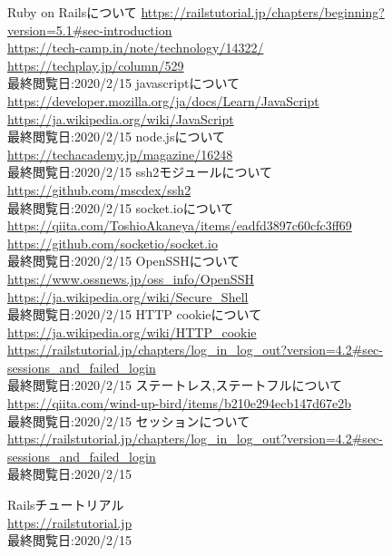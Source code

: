 \begin{thebibliography}{99}
 Ruby on Railsについて \url{https://railstutorial.jp/chapters/beginning?version=5.1#sec-introduction} \\ \url{https://tech-camp.in/note/technology/14322/} \\ \url{https://techplay.jp/column/529}  \\ 最終閲覧日:2020/2/15
 javascriptについて \\ \url{https://developer.mozilla.org/ja/docs/Learn/JavaScript} \\ \url{https://ja.wikipedia.org/wiki/JavaScript}\\ 最終閲覧日:2020/2/15
 node.jsについて \\ \url{https://techacademy.jp/magazine/16248} \\ 最終閲覧日:2020/2/15
 ssh2モジュールについて \\ \url{https://github.com/mscdex/ssh2} \\ 最終閲覧日:2020/2/15
 socket.ioについて \\ \url{https://qiita.com/ToshioAkaneya/items/eadfd3897c60cfc3ff69} \\ \url{https://github.com/socketio/socket.io} \\ 最終閲覧日:2020/2/15
 OpenSSHについて \\ \url{https://www.ossnews.jp/oss_info/OpenSSH} \\ \url{https://ja.wikipedia.org/wiki/Secure_Shell} \\ 最終閲覧日:2020/2/15
 HTTP cookieについて \\ \url{https://ja.wikipedia.org/wiki/HTTP_cookie} \\ \url{https://railstutorial.jp/chapters/log_in_log_out?version=4.2#sec-sessions_and_failed_login} \\ 最終閲覧日:2020/2/15
 ステートレス,ステートフルについて \\ \url{https://qiita.com/wind-up-bird/items/b210e294ecb147d67e2b} \\ 最終閲覧日:2020/2/15
 セッションについて \\ \url{https://railstutorial.jp/chapters/log_in_log_out?version=4.2#sec-sessions_and_failed_login} \\ 最終閲覧日:2020/2/15


 Railsチュートリアル \\ \url{https://railstutorial.jp} \\ 最終閲覧日:2020/2/15 


\end{thebibliography}
